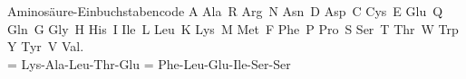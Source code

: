 \begin{topic}{Aminosäure-Einbuchstabencode}
    \scriptsize
    A Ala\, R Arg\, N Asn\, D Asp\, C Cys\, E Glu\, Q Gln\, G Gly\, H His\, I Ile\, L Leu\, K Lys\, M Met\, F Phe\, P Pro\, S Ser\, T Thr\, W Trp\, Y Tyr\, V Val.\\[2pt]
    \normalsize{} = Lys-Ala-Leu-Thr-Glu \quad {} = Phe-Leu-Glu-Ile-Ser-Ser
\end{topic}
